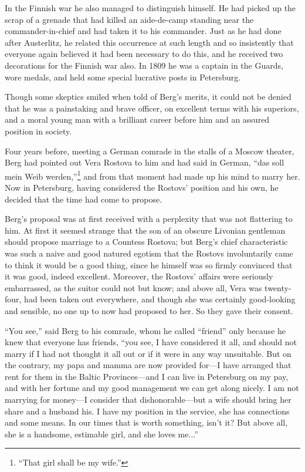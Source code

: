 In the Finnish war he also managed to distinguish himself. He had
picked up the scrap of a grenade that had killed an aide-de-camp
standing near the commander-in-chief and had taken it to his
commander. Just as he had done after Austerlitz, he related this
occurrence at such length and so insistently that everyone again
believed it had been necessary to do this, and he received two
decorations for the Finnish war also. In 1809 he was a captain in
the Guards, wore medals, and held some special lucrative posts in
Petersburg.

Though some skeptics smiled when told of Berg's merits, it could
not be denied that he was a painstaking and brave officer, on
excellent terms with his superiors, and a moral young man with a
brilliant career before him and an assured position in society.

Four years before, meeting a German comrade in the stalls of a
Moscow theater, Berg had pointed out Vera Rostova to him and had
said in German, ``das soll mein Weib werden,''\footnote{``That
girl shall be my wife.''} and from that moment had made up his
mind to marry her. Now in Petersburg, having considered the
Rostovs' position and his own, he decided that the time had come
to propose.

Berg's proposal was at first received with a perplexity that was
not flattering to him. At first it seemed strange that the son of
an obscure Livonian gentleman should propose marriage to a
Countess Rostova; but Berg's chief characteristic was such a
naive and good natured egotism that the Rostovs involuntarily
came to think it would be a good thing, since he himself was so
firmly convinced that it was good, indeed excellent. Moreover,
the Rostovs' affairs were seriously embarrassed, as the suitor
could not but know; and above all, Vera was twenty-four, had been
taken out everywhere, and though she was certainly good-looking
and sensible, no one up to now had proposed to her. So they gave
their consent.

``You see,'' said Berg to his comrade, whom he called ``friend''
only because he knew that everyone has friends, ``you see, I have
considered it all, and should not marry if I had not thought it
all out or if it were in any way unsuitable. But on the contrary,
my papa and mamma are now provided for---I have arranged that
rent for them in the Baltic Provinces---and I can live in
Petersburg on my pay, and with her fortune and my good management
we can get along nicely. I am not marrying for money---I consider
that dishonorable---but a wife should bring her share and a
husband his. I have my position in the service, she has
connections and some means. In our times that is worth something,
isn't it? But above all, she is a handsome, estimable girl, and
she loves me...''

